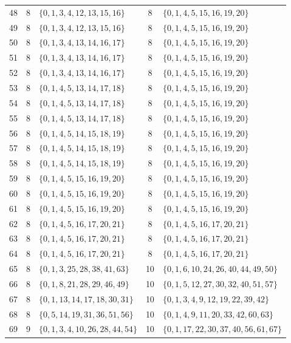\documentclass[11pt]{article}
\begin{document}
\begin{center}
\begin{longtable}{c c >{\raggedright\arraybackslash}p{} c >{\raggedright\arraybackslash}p{}}
			48 & 8 & \(\{0,1,3,4,12,13,15,16\}\) & 8 & \(\{0,1,4,5,15,16,19,20\}\) \\
			49 & 8 & \(\{0,1,3,4,12,13,15,16\}\) & 8 & \(\{0,1,4,5,15,16,19,20\}\) \\
			50 & 8 & \(\{0,1,3,4,13,14,16,17\}\) & 8 & \(\{0,1,4,5,15,16,19,20\}\) \\
			51 & 8 & \(\{0,1,3,4,13,14,16,17\}\) & 8 & \(\{0,1,4,5,15,16,19,20\}\) \\
			52 & 8 & \(\{0,1,3,4,13,14,16,17\}\) & 8 & \(\{0,1,4,5,15,16,19,20\}\) \\
			53 & 8 & \(\{0,1,4,5,13,14,17,18\}\) & 8 & \(\{0,1,4,5,15,16,19,20\}\) \\
			54 & 8 & \(\{0,1,4,5,13,14,17,18\}\) & 8 & \(\{0,1,4,5,15,16,19,20\}\) \\
			55 & 8 & \(\{0,1,4,5,13,14,17,18\}\) & 8 & \(\{0,1,4,5,15,16,19,20\}\) \\
			56 & 8 & \(\{0,1,4,5,14,15,18,19\}\) & 8 & \(\{0,1,4,5,15,16,19,20\}\) \\
			57 & 8 & \(\{0,1,4,5,14,15,18,19\}\) & 8 & \(\{0,1,4,5,15,16,19,20\}\) \\
			58 & 8 & \(\{0,1,4,5,14,15,18,19\}\) & 8 & \(\{0,1,4,5,15,16,19,20\}\) \\
			59 & 8 & \(\{0,1,4,5,15,16,19,20\}\) & 8 & \(\{0,1,4,5,15,16,19,20\}\) \\
			60 & 8 & \(\{0,1,4,5,15,16,19,20\}\) & 8 & \(\{0,1,4,5,15,16,19,20\}\) \\
			61 & 8 & \(\{0,1,4,5,15,16,19,20\}\) & 8 & \(\{0,1,4,5,15,16,19,20\}\) \\
			62 & 8 & \(\{0,1,4,5,16,17,20,21\}\) & 8 & \(\{0,1,4,5,16,17,20,21\}\) \\
			63 & 8 & \(\{0,1,4,5,16,17,20,21\}\) & 8 & \(\{0,1,4,5,16,17,20,21\}\) \\
			64 & 8 & \(\{0,1,4,5,16,17,20,21\}\) & 8 & \(\{0,1,4,5,16,17,20,21\}\) \\
			65 & 8 & \(\{0,1,3,25,28,38,41,63\}\) & 10 & \(\{0,1,6,10,24,26,40,44,49,50\}\) \\
			66 & 8 & \(\{0,1,8,21,28,29,46,49\}\) & 10 & \(\{0,1,5,12,27,30,32,40,51,57\}\) \\
			67 & 8 & \(\{0,1,13,14,17,18,30,31\}\) & 10 & \(\{0,1,3,4,9,12,19,22,39,42\}\) \\
			68 & 8 & \(\{0,5,14,19,31,36,51,56\}\) & 10 & \(\{0,1,4,9,11,20,33,42,60,63\}\) \\
			69 & 9 & \(\{0,1,3,4,10,26,28,44,54\}\) & 10 & \(\{0,1,17,22,30,37,40,56,61,67\}\) \\

\end{longtable}
\end{center}
\end{document}
